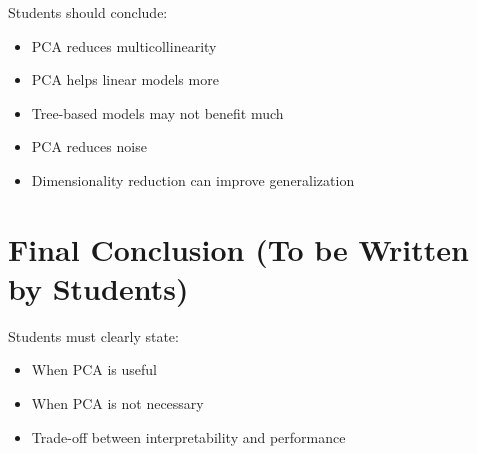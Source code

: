 \documentclass[11pt]{article}
\begin{document}
Students should conclude:

\begin{itemize}
    \item PCA reduces multicollinearity
    \item PCA helps linear models more
    \item Tree-based models may not benefit much
    \item PCA reduces noise
    \item Dimensionality reduction can improve generalization
\end{itemize}

\section*{Final Conclusion (To be Written by Students)}

Students must clearly state:

\begin{itemize}
    \item When PCA is useful
    \item When PCA is not necessary
    \item Trade-off between interpretability and performance
\end{itemize}
\end{document}
